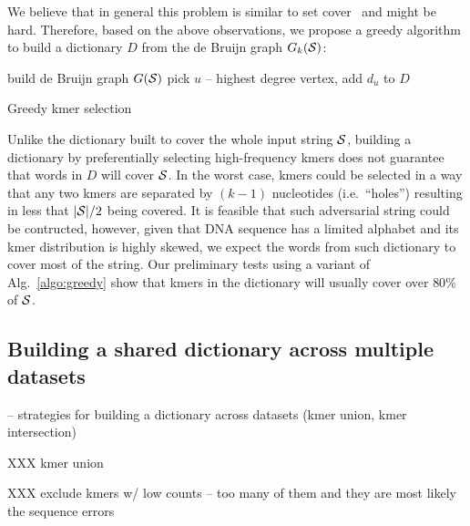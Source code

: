 \documentclass[12pt]{cmuthesis}
\makeatletter
\newcommand{\ie}{i.e.\@}
\makeatother
\begin{document}
  We believe that in general this problem is similar to set cover~\cite{SetCoverIsHard} and might be hard. Therefore, based on the above observations, we propose a greedy algorithm to build a dictionary $D$ from the de Bruijn graph $G_k(\mathcal{S})$:
  
  \begin{algorithm}[H]
   build de Bruijn graph $G(\mathcal{S})$\;
   pick $u$ -- highest degree vertex, add $d_u$ to $D$\;
   \caption{Greedy kmer selection}
   \label{algo:greedy}
  \end{algorithm}
  Unlike the dictionary built to cover the whole input string $\mathcal{S}$, building a dictionary by preferentially selecting high-frequency kmers does not guarantee that words in $D$ will cover $\mathcal{S}$. In the worst case, kmers could be selected in a way that any two kmers are separated by $(k-1)$ nucleotides (\ie~``holes'') resulting in less that $|\mathcal{S}| / 2$ being covered. It is feasible that such adversarial string could be contructed, however, given that DNA sequence has a limited alphabet and its kmer distribution is highly skewed, we expect the words from such dictionary to cover most of the string. Our preliminary tests using a variant of Alg.~\ref{algo:greedy} show that kmers in the dictionary will usually cover over $80\%$ of $\mathcal{S}$.

  \subsection{Building a shared dictionary across multiple datasets}


    -- strategies for building a dictionary across datasets (kmer union, kmer intersection)

  XXX kmer union

  XXX exclude kmers w/ low counts -- too many of them and they are most likely the sequence errors


\end{document}
